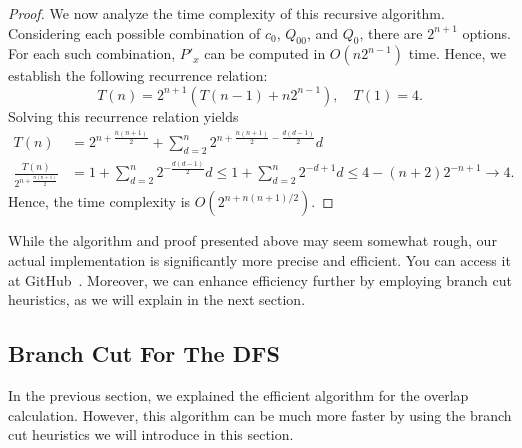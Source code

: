 \documentclass[a4paper, onecolumn, 11pt, longbibliography]{quantumarticle}
\begin{document}
\begin{proof}
  We now analyze the time complexity of this recursive algorithm.
  Considering each possible combination of $c_0$, $Q_{00}$, and $Q_0$, there are $2^{n+1}$ options. For each such combination, $P'_x$ can be computed in $O(n2^{n-1})$ time. Hence, we establish the following recurrence relation:
  \begin{equation*}
    T(n) = 2^{n+1} (T(n-1)+n2^{n-1}), \quad T(1) = 4.
  \end{equation*}
  Solving this recurrence relation yields
  \begin{align*}
    T(n)                                & = 2^{n+\frac{n(n+1)}{2}}+ \sum_{d=2}^{n} 2^{n+\frac{n(n+1)}{2}-\frac{d(d-1)}{2}}d \\
    \frac{T(n)}{2^{n+\frac{n(n+1)}{2}}} & = 1 + \sum_{d=2}^{n} 2^{-\frac{d(d-1)}{2}} d
    \leq 1 + \sum_{d=2}^{n} 2^{-d+1} d
    \leq 4-(n+2)2^{-n+1} \to 4.
  \end{align*}
  Hence, the time complexity is $O(2^{n+n(n+1)/2})$.
\end{proof}
While the algorithm and proof presented above may seem somewhat rough, our actual implementation is significantly more precise and efficient. You can access it at GitHub~\cite{Hamaguchi_stabilizer_extent_2024}.
Moreover, we can enhance efficiency further by employing branch cut heuristics, as we will explain in the next section.

\subsection{Branch Cut For The DFS}
\label{sec:branchCut}

In the previous section, we explained the efficient algorithm for the overlap calculation.
However, this algorithm can be much more faster
by using the branch cut heuristics we will introduce in this section.
\end{document}
